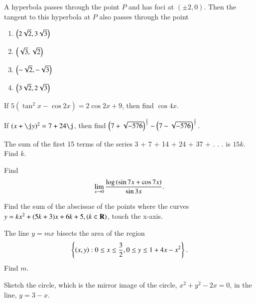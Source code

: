 \documentclass[journal,12pt,twocolumn]{IEEEtran}
\begin{document}
%
%
%
\begin{problem}
 A hyperbola passes through the point $P$  
and has foci at $(\pm 2, 0)$. Then the tangent
to this hyperbola
at $P$ also passes through the point
%
\begin{enumerate}
\item $\left(2\sqrt{2}, 3\sqrt{3}\right)$
\item $\left(\sqrt{3}, \sqrt{2}\right)$
\item $\left(-\sqrt{2}, -\sqrt{3}\right)$
\item $\left(3\sqrt{2}, 2\sqrt{3}\right)$
\end{enumerate}
\end{problem}
%
\begin{problem}
If $5(\tan^2 x-\cos2 x) = 2 \cos 2x+9$, then
find $\cos 4x$.
\end{problem}
\begin{problem}
If $(x + \j y)^2 = 7 + 24\j$, then find
$\left(7+\sqrt{-576}\right)^{\frac{1}{2}}-\left(7-\sqrt{-576}\right)^{\frac{1}{2}}$.
\end{problem}
\begin{problem}
The sum of the first 15 terms of the
series 3 + 7 + 14 + 24 + 37 + . . . is $15 k$. Find $k$.
\end{problem}
\begin{problem}
Find
\begin{equation}
\lim_{x\rightarrow 0} \frac{\log\left(\sin 7x  +\cos 7x \right)}{\sin 3x}.
\end{equation}
\end{problem}
\begin{problem}
Find the sum of the abscissae of the
points where the curves $y = kx^2 + (5k + 3)x + 6k +
5, (k \in \mathbf{R})$, touch the x-axis.
\end{problem}
%
\begin{problem}
The line $y = mx$ bisects the area of
the region
%
\begin{equation}
\left\{\left(x,y\right): 0 \le x 	\le \frac{3}{2}, 0 \le y \le 1 + 4x -x^2 \right\}.
\end{equation}
%
Find $m$.
\end{problem}
\begin{problem}
 Sketch the circle, which is the mirror
image of the circle, $x^2 + y^2 - 2x = 0$, in the line,
$y = 3-x$.
\end{problem}
\end{document}
